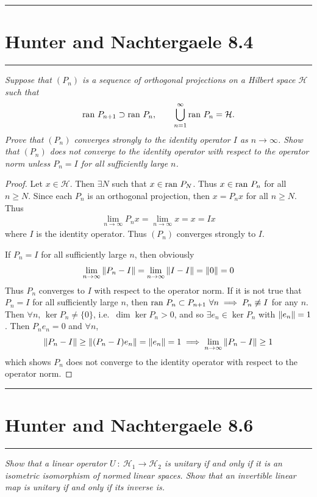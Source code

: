 \documentclass{article} %
\theoremstyle{plain}
\newcommand{\ran}{\text{\rm ran }}
\newcommand{\problem}[1]{
\vspace{.375cm}
\begin{minipage}{\textwidth}
    \begin{center}
        \noindent\rule{5cm}{1pt}
    \end{center}
    \section{\bf #1}
    \begin{center}
        \noindent\rule{5cm}{1pt}
    \end{center}
    \vspace{0.25cm}
\end{minipage}
}
\numberwithin{equation}{section} %
\numberwithin{figure}{section} %
\numberwithin{table}{section} %
\begin{document}
\problem{Hunter and Nachtergaele 8.4}
\emph{Suppose that $(P_n)$ is a sequence of orthogonal projections on a Hilbert space $\mathcal{H}$ such that $$\ran P_{n+1} \supset \ran P_n, \qquad \bigcup_{n=1}^\infty \ran P_n = \mathcal{H}.$$  Prove that $(P_n)$ converges strongly to the identity operator $I$ as $n \rightarrow \infty$.  Show that $(P_n)$ does not converge to the identity operator with respect to the operator norm unless $P_n = I$ for all sufficiently large $n$.} \\

\begin{proof}
    Let $x \in \mathcal{H}$.  Then $\exists N$ such that $x \in \ran P_N$.  Thus $x \in \ran P_n$ for all $n \geq N$.  Since each $P_n$ is an orthogonal projection, then $x = P_n x$ for all $n \geq N$.  Thus
    \begin{align*}
        \lim_{n\rightarrow \infty}P_n x = \lim_{n \rightarrow \infty} x = x = I x
    \end{align*}
    where $I$ is the identity operator.  Thus $(P_n)$ converges strongly to $I$.

    If $P_n = I$ for all sufficiently large $n$, then obviously
    \begin{align*}
        \lim_{n\rightarrow \infty} \norm{P_n - I} = \lim_{n\rightarrow \infty}\norm{I - I} = \norm{0} = 0
    \end{align*}
    Thus $P_n$ converges to $I$ with respect to the operator norm.  If it is not true that $P_n = I$ for all sufficiently large $n$, then $\ran P_n \subset P_{n+1}\ \forall n \implies P_n \not\equiv I$ for any $n$.  Then $\forall n$, $\ker P_n \neq \{0\}$, i.e.~$\dim \ker P_n > 0$, and so $\exists e_n \in \ker P_n$ with $\norm{e_n} = 1$.  Then $P_ne_n = 0$ and $\forall n$,
    \begin{align*}
        \norm{P_n - I} \geq \norm{(P_n - I)e_n} = \norm{e_n} = 1 \implies \lim_{n\rightarrow \infty}\norm{P_n - I} \geq 1
    \end{align*}
    which shows $P_n$ does not converge to the identity operator with respect to the operator norm.
\end{proof}









\problem{Hunter and Nachtergaele 8.6}
\emph{Show that a linear operator $U\ :\ \mathcal{H}_1 \rightarrow \mathcal{H}_2$ is unitary if and only if it is an isometric isomorphism of normed linear spaces.  Show that an invertible linear map is unitary if and only if its inverse is.} \\
\end{document}
